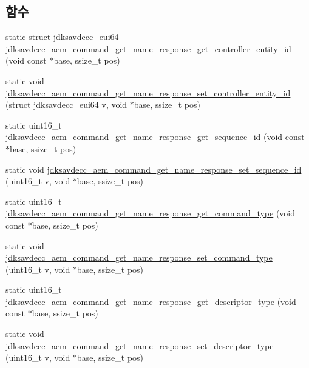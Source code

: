 \subsection*{함수}
\begin{DoxyCompactItemize}
\item 
static struct \hyperlink{structjdksavdecc__eui64}{jdksavdecc\+\_\+eui64} \hyperlink{group__command__get__name__response_gaf9f2c3d5bc5680f8469ed064264ca598}{jdksavdecc\+\_\+aem\+\_\+command\+\_\+get\+\_\+name\+\_\+response\+\_\+get\+\_\+controller\+\_\+entity\+\_\+id} (void const $\ast$base, ssize\+\_\+t pos)
\item 
static void \hyperlink{group__command__get__name__response_ga10a21005865d6ead0fda8992ea7980b9}{jdksavdecc\+\_\+aem\+\_\+command\+\_\+get\+\_\+name\+\_\+response\+\_\+set\+\_\+controller\+\_\+entity\+\_\+id} (struct \hyperlink{structjdksavdecc__eui64}{jdksavdecc\+\_\+eui64} v, void $\ast$base, ssize\+\_\+t pos)
\item 
static uint16\+\_\+t \hyperlink{group__command__get__name__response_ga0f1a9e00f38e8a3738bad40dcca8bec8}{jdksavdecc\+\_\+aem\+\_\+command\+\_\+get\+\_\+name\+\_\+response\+\_\+get\+\_\+sequence\+\_\+id} (void const $\ast$base, ssize\+\_\+t pos)
\item 
static void \hyperlink{group__command__get__name__response_ga836e1462cb4e023c8f5c8bacc05ab0d1}{jdksavdecc\+\_\+aem\+\_\+command\+\_\+get\+\_\+name\+\_\+response\+\_\+set\+\_\+sequence\+\_\+id} (uint16\+\_\+t v, void $\ast$base, ssize\+\_\+t pos)
\item 
static uint16\+\_\+t \hyperlink{group__command__get__name__response_gabb131c152dc0637ae3a70f2039a7730d}{jdksavdecc\+\_\+aem\+\_\+command\+\_\+get\+\_\+name\+\_\+response\+\_\+get\+\_\+command\+\_\+type} (void const $\ast$base, ssize\+\_\+t pos)
\item 
static void \hyperlink{group__command__get__name__response_ga14f1c6897dfc0437fe2c928f2b0c2d10}{jdksavdecc\+\_\+aem\+\_\+command\+\_\+get\+\_\+name\+\_\+response\+\_\+set\+\_\+command\+\_\+type} (uint16\+\_\+t v, void $\ast$base, ssize\+\_\+t pos)
\item 
static uint16\+\_\+t \hyperlink{group__command__get__name__response_gadfcaac47791f78eeba3f25040e453265}{jdksavdecc\+\_\+aem\+\_\+command\+\_\+get\+\_\+name\+\_\+response\+\_\+get\+\_\+descriptor\+\_\+type} (void const $\ast$base, ssize\+\_\+t pos)
\item 
static void \hyperlink{group__command__get__name__response_ga2470b84f270b4f3382c2c6c3990bc818}{jdksavdecc\+\_\+aem\+\_\+command\+\_\+get\+\_\+name\+\_\+response\+\_\+set\+\_\+descriptor\+\_\+type} (uint16\+\_\+t v, void $\ast$base, ssize\+\_\+t pos)

\end{DoxyCompactItemize}

